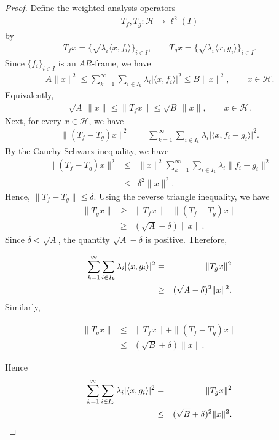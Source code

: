 \documentclass[12pt,titlepage]{amsart}
\theoremstyle{definition}
\theoremstyle{remark}
\begin{document}
\begin{proof}
Define the weighted analysis operators
\begin{eqnarray*}
T_f,T_g:\mathcal H\longrightarrow \ell^2(I)
\end{eqnarray*}
by
\begin{eqnarray*}
T_fx = \{\sqrt{\lambda_i}\langle x,f_i\rangle\}_{i\in I}, \qquad
T_gx = \{\sqrt{\lambda_i}\langle x,g_i\rangle\}_{i\in I}.
\end{eqnarray*}
Since $\{f_i\}_{i\in I}$ is an $AR$-frame, we have
\begin{eqnarray*}
A\|x\|^2 \le \sum_{k=1}^{\infty}\sum_{i\in I_k} \lambda_i |\langle
x,f_i\rangle|^2 \le B\|x\|^2, \qquad x\in\mathcal H.
\end{eqnarray*}
Equivalently,
\begin{eqnarray*}
\sqrt A\,\|x\| \le \|T_fx\| \le \sqrt B\,\|x\|, \qquad
x\in\mathcal H.
\end{eqnarray*}
Next, for every $x\in\mathcal H$, we have
\begin{eqnarray*}
\|(T_f-T_g)x\|^2 &= \sum_{k=1}^{\infty}\sum_{i\in I_k} \lambda_i
\big| \langle x,f_i-g_i\rangle \big|^2.
\end{eqnarray*}
By the Cauchy-Schwarz inequality, we have
\begin{eqnarray*}
\|(T_f-T_g)x\|^2 &\le& \|x\|^2 \sum_{k=1}^{\infty}\sum_{i\in I_k}
\lambda_i \|f_i-g_i\|^2\\ &\le& \delta^2\|x\|^2.
\end{eqnarray*}
Hence, $\|T_f-T_g\| \le \delta$. Using the reverse triangle
inequality, we have
\begin{eqnarray*}
\|T_gx\| &\ge& \|T_fx\| - \|(T_f-T_g)x\|\\ &\ge& (\sqrt
A-\delta)\|x\|.
\end{eqnarray*}
Since $\delta<\sqrt A$, the quantity $\sqrt A-\delta$ is positive.
Therefore,

\begin{eqnarray} \label{eqn-95} \notag
\sum_{k=1}^{\infty}\sum_{i\in I_k} \lambda_i |\langle
x,g_i\rangle|^2 &=& \|T_gx\|^2\\ &\ge& (\sqrt A-\delta)^2\|x\|^2.
\end{eqnarray}
Similarly,

\begin{eqnarray*}
\|T_gx\| &\le& \|T_fx\| + \|(T_f-T_g)x\|\\ &\le& (\sqrt
B+\delta)\|x\|.
\end{eqnarray*}

Hence
\begin{eqnarray} \label{eqn-96} \notag
\sum_{k=1}^{\infty}\sum_{i\in I_k} \lambda_i |\langle
x,g_i\rangle|^2 &=& \|T_gx\|^2\\ &\le& (\sqrt B+\delta)^2\|x\|^2.
\end{eqnarray}


\end{proof}
\end{document}
